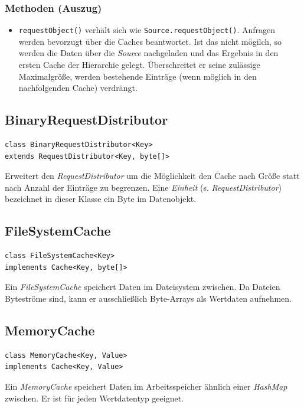 \documentclass[10pt]{scrreprt}
\begin{document}
\subsubsection*{Methoden (Auszug)}
\begin{itemize}
\item \texttt{requestObject()} verhält sich wie \texttt{Source.requestObject()}. Anfragen werden bevorzugt über die Caches beantwortet. Ist das nicht mögilch, so werden die Daten über die \textit{Source} nachgeladen und das Ergebnis in den ersten Cache der Hierarchie gelegt. Überschreitet er seine zulässige Maximalgröße, werden bestehende Einträge (wenn möglich in den nachfolgenden Cache) verdrängt. 
\end{itemize}
\vspace{5mm}
\subsection*{BinaryRequestDistributor}
\begin{lstlisting}
class BinaryRequestDistributor<Key>
extends RequestDistributor<Key, byte[]>
\end{lstlisting}
Erweitert den \textit{RequestDistributor} um die Möglichkeit den Cache nach Größe statt nach Anzahl der Einträge zu begrenzen. Eine \textit{Einheit} (s. \textit{RequestDistributor}) bezeichnet in dieser Klasse ein Byte im Datenobjekt.
\pagebreak
\subsection*{FileSystemCache}
\begin{lstlisting}
class FileSystemCache<Key>
implements Cache<Key, byte[]>
\end{lstlisting}
Ein \textit{FileSystemCache} speichert Daten im Dateisystem zwischen. Da Dateien Byteströme sind, kann er ausschließlich Byte-Arrays als Wertdaten aufnehmen.\\

\vspace{5mm}
\subsection*{MemoryCache}
\begin{lstlisting}
class MemoryCache<Key, Value>
implements Cache<Key, Value>
\end{lstlisting}
Ein \textit{MemoryCache} speichert Daten im Arbeitsspeicher ähnlich einer \textit{HashMap} zwischen. Er ist für jeden Wertdatentyp geeignet.\\
\end{document}
